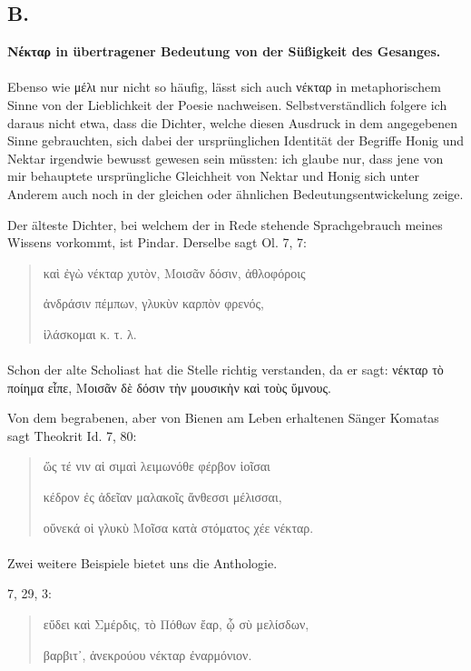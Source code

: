 \documentclass[a4paper, 11pt, oneside]{article}
\begin{document}
\subsection{B.}
\begin{center}
\textbf{Νέκταρ in übertragener Bedeutung von der Süßigkeit des Gesanges.}
\end{center}
\paragraph{}
Ebenso wie μέλι nur nicht so häufig, lässt sich auch νέκταρ in metaphorischem Sinne von der Lieblichkeit der Poesie nachweisen. Selbstverständlich folgere ich daraus nicht etwa, dass die Dichter, welche diesen Ausdruck in dem angegebenen Sinne gebrauchten, sich dabei der ursprünglichen Identität der Begriffe Honig und Nektar irgendwie bewusst gewesen sein müssten: ich glaube nur, dass jene von mir behauptete ursprüngliche Gleichheit von Nektar und Honig sich unter Anderem auch noch in der gleichen oder ähnlichen Bedeutungsentwickelung zeige.

Der älteste Dichter, bei welchem der in Rede stehende Sprachgebrauch meines Wissens vorkommt, ist Pindar. Derselbe sagt Ol. 7, 7:
\begin{quotation}
καὶ ἐγὼ νέκταρ χυτὸν, Μοισᾶν δόσιν, ἀθλοφόροις

ἀνδράσιν πέμπων, γλυκὺν καρπὸν φρενός,

ἱλάσκομαι κ. τ. λ.
\end{quotation}
\paragraph{}
Schon der alte Scholiast hat die Stelle richtig verstanden, da er sagt: νέκταρ τὸ ποίημα εἶπε, Μοισᾶν δὲ δόσιν τὴν μουσικὴν καὶ τοὺς ὕμνους.

Von dem begrabenen, aber von Bienen am Leben erhaltenen Sänger Komatas sagt Theokrit Id. 7, 80:
\begin{quotation}
ὥς τέ νιν αἱ σιμαὶ λειμωνόθε φέρβον ἰοῖσαι

κέδρον ἐς ἀδεῖαν μαλακοῖς ἄνθεσσι μέλισσαι,

οὔνεκά οἱ γλυκὺ Μοῖσα κατὰ στόματος χέε νέκταρ.
\end{quotation}
\paragraph{}
Zwei weitere Beispiele bietet uns die Anthologie.

7, 29, 3:
\begin{quotation}
εὔδει καὶ Σμέρδις, τὸ Πόθων ἔαρ, ᾧ σὺ μελίσδων,

βαρβιτ᾽, ἀνεκρούου νέκταρ ἐναρμόνιον.
\end{quotation}
\end{document}
